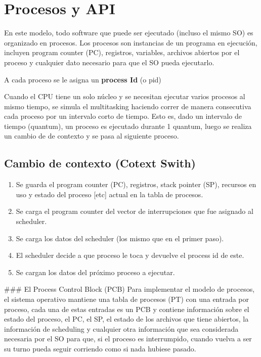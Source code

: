 \section{Procesos y API}
En este modelo, todo software que puede ser ejecutado (incluso el mismo SO) es organizado en procesos. Los procesos son instancias de un programa en ejecución, incluyen program counter (PC), registros, variables, archivos abiertos por el proceso y cualquier dato necesario para que el SO pueda ejecutarlo.

A cada proceso se le asigna un \textbf{process Id} (o pid)

Cuando el CPU tiene un solo núcleo y se necesitan ejecutar varios procesos al mismo tiempo, se simula el multitasking haciendo correr de manera consecutiva cada proceso por un intervalo corto de tiempo. Esto es, dado un intervalo de tiempo (quantum), un proceso es ejecutado durante 1 quantum, luego se realiza un cambio de de contexto y se pasa al siguiente proceso.


\subsection{Cambio de contexto (Cotext Swith)}
\begin{enumerate}
\item Se guarda el program counter (PC), registros, stack pointer (SP), recursos en uso y estado del proceso [etc] actual en la tabla de procesos.
\item Se carga el program counter del vector de interrupciones que fue asignado al scheduler.
\item Se carga los datos del scheduler (los mismo que en el primer paso).
\item El scheduler decide a que proceso le toca y devuelve el process id de este.
\item Se cargan los datos del próximo proceso a ejecutar.

\end{enumerate}

### El Process Control Block (PCB)
Para implementar el modelo de procesos, el sistema operativo mantiene una tabla de procesos (PT) con una entrada por proceso, cada una de estas entradas es un PCB y contiene información sobre el estado del proceso, el PC, el SP, el estado de los archivos que tiene abiertos, la información de scheduling y cualquier otra información que sea considerada necesaria por el SO para que, si el proceso es interrumpido, cuando vuelva a ser su turno pueda seguir corriendo como si nada hubiese pasado.

